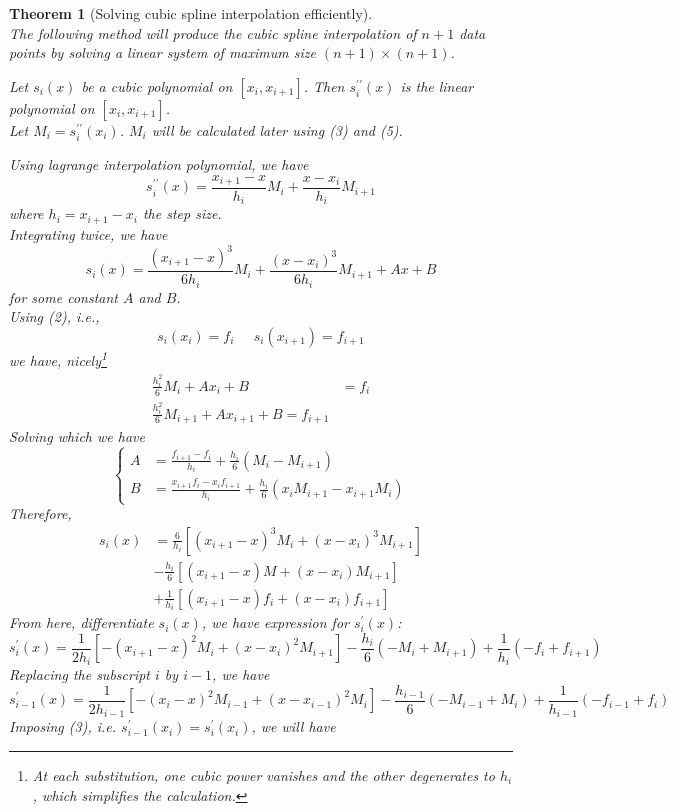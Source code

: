 \documentclass[12pt]{article}
\newtheorem{theorem}{Theorem}[section]
\theoremstyle{definition}
\begin{document}
\begin{theorem}[Solving cubic spline interpolation efficiently]
\hfill\\\normalfont The following method will produce the cubic spline interpolation of $n+1$ data points by solving a linear system of maximum size $(n+1)\times(n+1)$.

Let $s_i(x)$ be a cubic polynomial on $[x_i,x_{i+1}]$. Then $s^{\prime\prime}_i(x)$ is the linear polynomial on $[x_i,x_{i+1}]$.\\Let $M_i = s^{\prime\prime}_i(x_i)$. $M_i$ will be calculated later using (3) and (5).

Using lagrange interpolation polynomial, we have
\[
s^{\prime\prime}_i(x) = \frac{x_{i+1}-x}{h_i}M_i+\frac{x-x_i}{h_i}M_{i+1}
\]
where $h_i = x_{i+1}-x_i$ the step size.\\
Integrating twice, we have
\[
s_i(x) = \frac{(x_{i+1}-x)^3}{6h_i}M_i+\frac{(x-x_i)^3}{6h_i}M_{i+1}+Ax+B
\]
for some constant $A$ and $B$.\\
Using (2), i.e.,
\[
s_i(x_i) = f_i\;\;\;\;\;s_i(x_{i+1})=f_{i+1}
\]
we have, nicely\footnote{At each substitution, one cubic power vanishes and the other degenerates to $h_i$, which simplifies the calculation.}
\begin{align*}
\frac{h_i^2}{6}M_i+Ax_i+B&=f_i\\
\frac{h_i^2}{6}M_{i+1}+Ax_{i+1}+B=f_{i+1}
\end{align*}
Solving which we have
\[
\begin{cases}
A&=\frac{f_{i+1}-f_i}{h_i}+\frac{h_i}{6}(M_i-M_{i+1})\\
B&=\frac{x_{i+1}f_i-x_if_{i+1}}{h_i}+\frac{h_i}{6}(x_iM_{i+1}-x_{i+1}M_i)
\end{cases}
\]
Therefore,
\begin{align*}
s_i(x) &= \frac{6}{h_i}[(x_{i+1}-x)^3M_i+(x-x_i)^3M_{i+1}]\\
      &-\frac{h_i}{6}[(x_{i+1}-x)M+(x-x_i)M_{i+1}]\\
      &+\frac{1}{h_i}[(x_{i+1}-x)f_i+(x-x_i)f_{i+1}]
\end{align*}
From here, differentiate $s_i(x)$, we have expression for $s_i^\prime(x)$:
\[
s_i^\prime(x) = \frac{1}{2h_i}[-(x_{i+1}-x)^2M_i+(x-x_i)^2M_{i+1}]-\frac{h_i}{6}(-M_i+M_{i+1})+\frac{1}{h_i}(-f_i+f_{i+1})
\]
Replacing the subscript $i$ by $i-1$, we have
\[
s_{i-1}^\prime(x) = \frac{1}{2h_{i-1}}[-(x_{i}-x)^2M_{i-1}+(x-x_{i-1})^2M_{i}]-\frac{h_{i-1}}{6}(-M_{i-1}+M_{i})+\frac{1}{h_{i-1}}(-f_{i-1}+f_{i})
\]
Imposing (3), i.e. $s^\prime_{i-1}(x_i) = s^\prime_{i}(x_i)$, we will have

\end{theorem}
\end{document}
